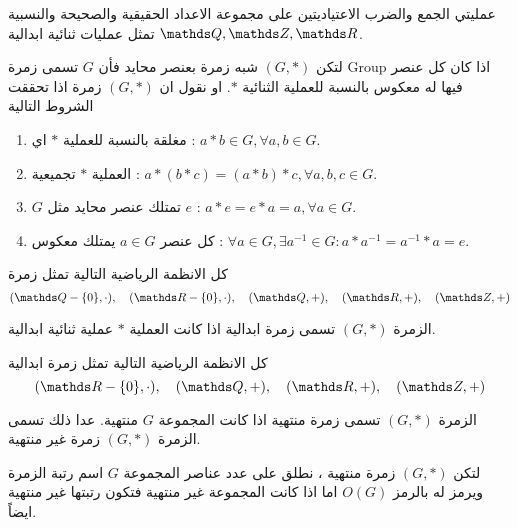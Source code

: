\begin{example}
	عمليتي الجمع والضرب الاعتياديتين على مجموعة الاعداد الحقيقية والصحيحة والنسبية $\Q, \Z, \R$ تمثل عمليات ثنائية ابدالية. 
\end{example}

\begin{definition}
	لتكن $(G, *)$ شبه زمرة بعنصر محايد فأن $G$ تسمى زمرة Group اذا كان كل عنصر فيها له معكوس بالنسبة للعملية الثنائية $*$. او نقول ان $(G, *)$ زمرة اذا تحققت الشروط التالية
	\begin{enumerate}[label=$\boxed{\arabic*}$]
		\item مغلقة بالنسبة للعملية $*$ اي : $a*b \in G , \forall a, b\in G$.
		\item العملية $*$ تجميعية : $a*(b*c) = (a*b)*c , \forall a, b,c\in G$.
		\item $G$ تمتلك عنصر محايد مثل $e$ : $a*e =e*a=a, \forall a\in G$.
		\item كل عنصر $a\in G$ يمتلك معكوس : $\forall a\in G, \exists a^{-1}\in G : a*a^{-1}=a^{-1}*a=e$.
	\end{enumerate}    
\end{definition}

\begin{example}
	كل الانظمة الرياضية التالية تمثل زمرة
	\[
	(\Q-\{0\}, \cdot), \quad(\R-\{0\}, \cdot),\quad (\Q, +) ,\quad (\R, +) ,\quad (\Z, +)
	\]
\end{example}

\begin{definition}
	الزمرة $(G, *)$ تسمى زمرة ابدالية اذا كانت العملية $*$ عملية ثنائية ابدالية.
\end{definition}

\begin{example}
	كل الانظمة الرياضية التالية تمثل زمرة ابدالية
	\[
	(\R-\{0\}, \cdot),\quad (\Q, +) ,\quad (\R, +) ,\quad (\Z, +)
	\]
\end{example}

\begin{definition}
	الزمرة $(G, * )$ تسمى زمرة منتهية اذا كانت المجموعة $G$ منتهية. عدا ذلك تسمى الزمرة $(G, *)$ زمرة غير منتهية. 
\end{definition}

\begin{definition}
	لتكن $(G, *)$ زمرة منتهية ، نطلق على عدد عناصر المجموعة $G$ اسم رتبة الزمرة ويرمز له بالرمز $O(G)$ اما اذا كانت المجموعة غير منتهية فتكون رتبتها غير منتهية ايضاً.
\end{definition}


